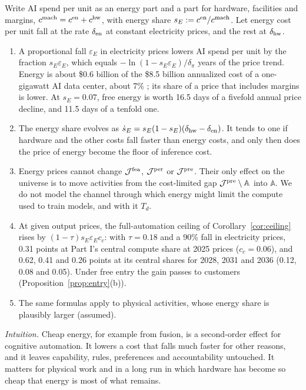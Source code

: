 \begin{proposition}\label{prop:ext-energy}
Write AI spend per unit as an energy part and a part for hardware, facilities and margins, $c^{\rm mach}=c^{\rm en}+c^{\rm hw}$, with energy share $s_E:=c^{\rm en}/c^{\rm mach}$. Let energy cost per unit fall at the rate $\delta_{\rm en}$ at constant electricity prices, and the rest at $\delta_{\rm hw}$.
\begin{enumerate}
\item[(a)] A proportional fall $\varepsilon_E$ in electricity prices lowers AI spend per unit by the fraction $s_E\varepsilon_E$, which equals $-\ln(1-s_E\varepsilon_E)/\delta_\pi$ years of the price trend. Energy is about \$0.6 billion of the \$8.5 billion annualized cost of a one-gigawatt AI data center, about 7\% \citep{michael2026servers}; its share of a price that includes margins is lower. At $s_E=0.07$, free energy is worth 16.5 days of a fivefold annual price decline, and 11.5 days of a tenfold one.
\item[(b)] The energy share evolves as $\dot s_E=s_E(1-s_E)(\delta_{\rm hw}-\delta_{\rm en})$. It tends to one if hardware and the other costs fall faster than energy costs, and only then does the price of energy become the floor of inference cost.
\item[(c)] Energy prices cannot change $\mathcal J^{\rm fea}$, $\mathcal J^{\rm per}$ or $\mathcal J^{\rm pre}$. Their only effect on the universe is to move activities from the cost-limited gap $\mathcal J^{\rm pre}\setminus\mathbb A$ into $\mathbb A$. We do not model the channel through which energy might limit the compute used to train models, and with it $T_d$.
\item[(d)] At given output prices, the full-automation ceiling of Corollary~\ref{cor:ceiling} rises by $(1-\tau)s_E\varepsilon_Ec_c$: with $\tau=0.18$ and a 90\% fall in electricity prices, 0.31 points at Part I's central compute share at 2025 prices ($c_c=0.06$), and 0.62, 0.41 and 0.26 points at its central shares for 2028, 2031 and 2036 (0.12, 0.08 and 0.05). Under free entry the gain passes to customers (Proposition~\ref{prop:entry}(b)).
\item[(e)] The same formulas apply to physical activities, whose energy share is plausibly larger (assumed).
\end{enumerate}
\end{proposition}

\noindent\emph{Intuition.} Cheap energy, for example from fusion, is a second-order effect for cognitive automation. It lowers a cost that falls much faster for other reasons, and it leaves capability, rules, preferences and accountability untouched. It matters for physical work and in a long run in which hardware has become so cheap that energy is most of what remains.

